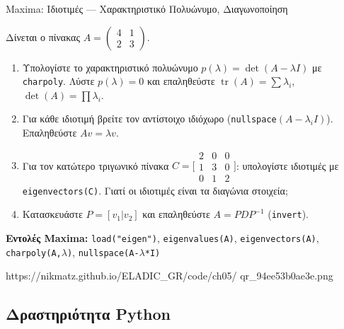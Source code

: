 %

\casactivbox%
  {Maxima: Ιδιοτιμές — Χαρακτηριστικό Πολυώνυμο, Διαγωνοποίηση}%
  {%
    \label{cas:ch5_eigenvalues}
    Δίνεται ο πίνακας
    $A = \begin{pmatrix} 4 & 1 \\ 2 & 3 \end{pmatrix}$.
    \begin{enumerate}[label=(\alph*),itemsep=2pt]
      \item Υπολογίστε το χαρακτηριστικό πολυώνυμο
        $p(\lambda)=\det(A-\lambda I)$ με \texttt{charpoly}.
        Λύστε $p(\lambda)=0$ και επαληθεύστε $\operatorname{tr}(A)=\sum\lambda_i$,
        $\det(A)=\prod\lambda_i$.
      \item Για κάθε ιδιοτιμή βρείτε τον αντίστοιχο
        ιδιόχωρο (\texttt{nullspace}$(A-\lambda_i I)$).
        Επαληθεύστε $Av=\lambda v$.
      \item Για τον κατώτερο τριγωνικό πίνακα
        $C=\bigl[\begin{smallmatrix}2&0&0\\1&3&0\\0&1&2\end{smallmatrix}\bigr]$:
        υπολογίστε ιδιοτιμές με \texttt{eigenvectors(C)}.
        Γιατί οι ιδιοτιμές είναι τα διαγώνια στοιχεία;
      \item Κατασκευάστε $P=[v_1|v_2]$ και επαληθεύστε
        $A=PDP^{-1}$ (\texttt{invert}).
    \end{enumerate}
    \smallskip
    \textbf{Εντολές Maxima:}
    \texttt{load("eigen")}, \texttt{eigenvalues(A)},
    \texttt{eigenvectors(A)}, \texttt{charpoly(A,$\lambda$)},
    \texttt{nullspace(A-$\lambda$*I)}
  }%
  {https://nikmatz.github.io/ELADIC_GR/code/ch05/}%
  {qr_94ee53b0ae3e.png}

\subsection*{Δραστηριότητα Python}

